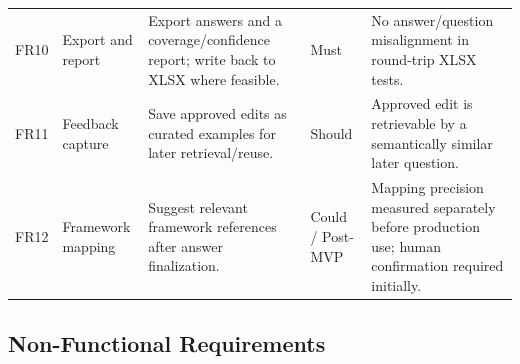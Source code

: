 \documentclass[11pt,journal,onecolumn]{IEEEtran}
\begin{document}
\begin{table}[H]
\begin{tabularx}{\textwidth}{L{0.07\textwidth}L{0.24\textwidth}Y L{0.09\textwidth}Y}
FR10 & Export and report & Export answers and a coverage/confidence report; write back to XLSX where feasible. & Must & No answer/question misalignment in round-trip XLSX tests. \\
FR11 & Feedback capture & Save approved edits as curated examples for later retrieval/reuse. & Should & Approved edit is retrievable by a semantically similar later question. \\
FR12 & Framework mapping & Suggest relevant framework references after answer finalization. & Could / Post-MVP & Mapping precision measured separately before production use; human confirmation required initially. \\
\bottomrule
\end{tabularx}
\end{table}

\subsection{Non-Functional Requirements}
\end{document}
